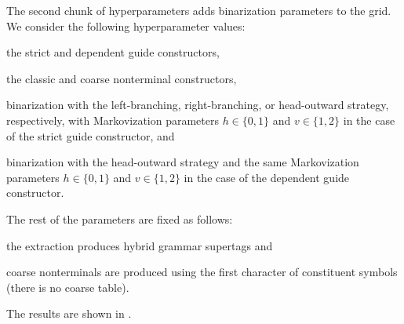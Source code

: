 \documentclass[../../document.tex]{subfiles}
\begin{document}
    The second chunk of hyperparameters adds binarization parameters to the grid.
    We consider the following hyperparameter values:
    \begin{compactitem}
        \item the strict and dependent guide constructors,
        \item the classic and coarse nonterminal constructors,
        \item binarization with the left-branching, right-branching, or head-outward strategy, respectively, with Markovization parameters \(h \in \{0,1\}\) and \(v \in \{1,2\}\) in the case of the strict guide constructor, and
        \item binarization with the head-outward strategy and the same Markovization parameters \(h \in \{0,1\}\) and \(v \in \{1,2\}\) in the case of the dependent guide constructor.
    \end{compactitem}
    The rest of the parameters are fixed as follows:
    \begin{compactitem}
        \item the extraction produces hybrid grammar supertags and
        \item coarse nonterminals are produced using the first character of constituent symbols (there is no coarse table).
    \end{compactitem}
    The results are shown in .
\end{document}
